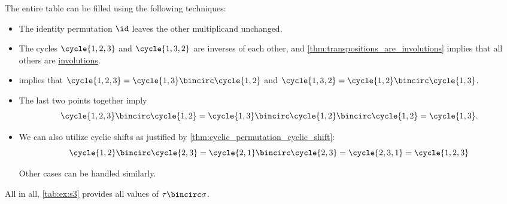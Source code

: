 \begin{example}
  The entire table can be filled using the following techniques:
  \begin{itemize}
    \item The identity permutation \( \id \) leaves the other multiplicand unchanged.
    \item The cycles \( \cycle{ 1, 2, 3 } \) and \( \cycle{ 1, 3, 2 } \) are inverses of each other, and \cref{thm:transpositions_are_involutions} implies that all others are \hyperref[def:categorical_involution]{involutions}.
    \item {} implies that \( \cycle{ 1, 2, 3 } = \cycle{ 1, 3 } \bincirc \cycle{ 1, 2 } \) and \( \cycle{ 1, 3, 2 } = \cycle{ 1, 2 } \bincirc \cycle{ 1, 3 } \).
    \item The last two points together imply
    \begin{equation*}
      \cycle{ 1, 2, 3 } \bincirc \cycle{ 1, 2 }
      =
      \cycle{ 1, 3 } \bincirc \cycle{ 1, 2 } \bincirc \cycle{ 1, 2 }
      =
      \cycle{ 1, 3 }.
    \end{equation*}

    \item We can also utilize cyclic shifts as justified by \cref{thm:cyclic_permutation_cyclic_shift}:
    \begin{equation*}
      \cycle{ 1, 2 } \bincirc \cycle{ 2, 3 }
      =
      \cycle{ 2, 1 } \bincirc \cycle{ 2, 3 }
      =
      \cycle{ 2, 3, 1 }
      =
      \cycle{ 1, 2, 3 }
    \end{equation*}

    Other cases can be handled similarly.
  \end{itemize}

  All in all, \cref{tab:ex:s3} provides all values of \( \tau \bincirc \sigma \).


\end{example}
